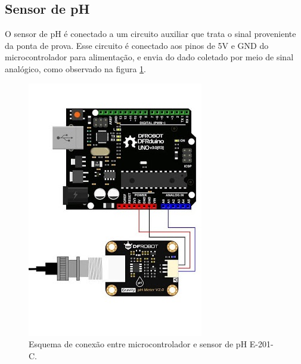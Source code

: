 






\subsection{Sensor de pH}

O sensor de pH é conectado a um circuito auxiliar que trata o sinal proveniente da ponta de prova. Esse circuito é conectado aos pinos de 5V e GND do microcontrolador para alimentação, e envia do dado coletado por meio de sinal analógico, como observado na figura \ref{fig:micro_ph}. 


\begin{figure}[h]
    \centering
    \includegraphics[scale=0.65]{figuras/implementacao/hardware/micro_ph.jpg}
    \caption{Esquema de conexão entre microcontrolador e sensor de pH E-201-C.}
    \label{fig:micro_ph}
\end{figure}


